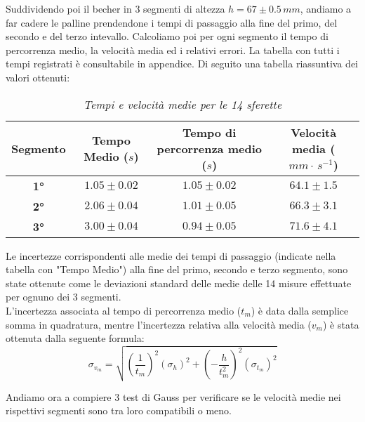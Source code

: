 \documentclass{article}
\begin{document}
\vspace{0.2cm}
Suddividendo poi il becher in 3 segmenti di altezza $h = 67 \pm 0.5\,mm$, andiamo a far cadere le palline prendendone i tempi di passaggio alla fine del primo, del secondo e del terzo intevallo. Calcoliamo poi per ogni segmento il tempo di percorrenza medio, la velocità media ed i relativi errori. La tabella con tutti i tempi registrati è consultabile in appendice. Di seguito una tabella riassuntiva dei valori ottenuti:

\begin{table}[!ht]
\centering
\renewcommand{\arraystretch}{1.2} %
\begin{tabular}{|c|c|c|c|}
\hline
\textbf{Segmento} & \textbf{Tempo Medio ($s$)} & \textbf{Tempo di percorrenza medio ($s$)} & \textbf{Velocità media ($mm\cdot\,s^{-1}$)} \\
\hline
\textbf{1°} & $1.05 \pm 0.02 $ & $1.05 \pm 0.02$ & $64.1 \pm 1.5$ \\
\textbf{2°} & $2.06 \pm 0.04 $ & $1.01 \pm 0.05$ & $66.3 \pm 3.1$ \\
\textbf{3°} & $3.00 \pm 0.04 $ & $0.94 \pm 0.05$ & $71.6 \pm 4.1$ \\
\hline
\end{tabular}
\caption{\textit{Tempi e velocità medie per le 14 sferette}}
\end{table}

Le incertezze corrispondenti alle medie dei tempi di passaggio (indicate nella tabella con "Tempo Medio") alla fine del primo, secondo e terzo segmento, sono state ottenute come le deviazioni standard delle medie delle 14 misure effettuate per ognuno dei 3 segmenti. \\L'incertezza associata al tempo di percorrenza medio ($t_m$) è data dalla semplice somma in quadratura, mentre l'incertezza relativa alla velocità media ($v_m$) è stata ottenuta dalla seguente formula: 
\vspace{0.1cm}
\begin{equation}
    \sigma_{v_m} = \sqrt{\left(\frac{1}{t_m}\right)^2\left(\sigma_{h}\right)^2 + \left(-\frac{h}{t_{m}^2}\right)^2 \left(\sigma_{t_m}\right)^2}
\end{equation}
\vspace{0.3cm}

Andiamo ora a compiere 3 test di Gauss per verificare se le velocità medie nei rispettivi segmenti sono tra loro compatibili o meno.
\end{document}
